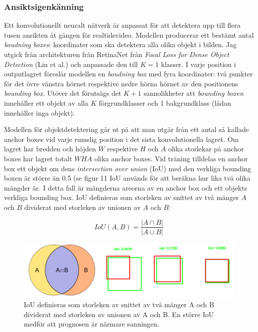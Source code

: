 \documentclass[a4paper,11pt,twoside]{article}
\begin{document}
\subsubsection{Ansiktsigenkänning}
Ett konvolutionellt neuralt nätverk är anpassat för att detektera upp till flera tusen ansikten åt gången för realtidsvideo. Modellen producerar ett bestämt antal \textit{boudning boxes}: koordinater som ska detektera alla olika objekt i bilden. Jag utgick från architekturen från RetinaNet från \textit{Focal Loss for Dense Object Detection} (Lin et al.) och anpassade den till $K = 1$ klasser. I varje position i outputlagret föreslår modellen en \textit{boudning box} med fyra koordinater: två punkter för det övre vänstra hörnet respektive nedre hörna hörnet av den positionens \textit{bounding box}. Utöver det förutsägs det $K+1$ sannolikheter att \textit{bounding boxen} innehåller ett objekt av alla $K$ förgrundklasser och 1 bakgrundklass (lådan innehåller inga objekt).\cite{cs231n}\cite{retinanet}

Modellen för objektdetektering går ut på att man utgår från ett antal så kallade anchor boxes vid varje rumslig position i det sista konvolutionella lagret. Om lagret har bredden och höjden $W$ respektive $H$ och $A$ olika storlekar på anchor boxes har lagret totalt $WHA$ olika anchor boxes. Vid träning tilldelas en anchor box ett objekt om dens \textit{intersection over union} (IoU) med den verkliga bounding boxen är större än 0.5 (se figur 11 IoU används för att beräkna hur lika två olika mängder är. I detta fall är mängderna areorna av en anchor box och ett objekts verkliga bounding box. IoU definieras som storleken av snittet av två mänger $A$ och $B$ dividerat med storleken av unionen av $A$ och $B$: \cite{cs231n} \cite{iou}

\begin{equation}
IoU(A, B)=\frac{|A \cap B|}{|A \cup B|}
\end{equation}

\begin{figure}[h]\label{figiou}
	\centering
  		\includegraphics[scale=0.5]{iou.png}
  	\caption{IoU definieras som storleken av snittet av två mänger A och B dividerat med storleken av unionen av A och B. En större IoU medför att prognosen är närmare sanningen. \cite{iou}}
\end{figure}
\end{document}
